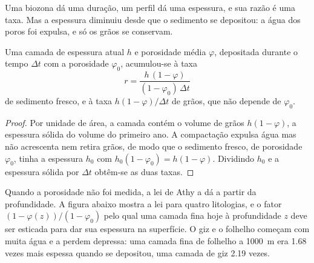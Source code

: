 Uma biozona dá uma duração, um perfil dá uma espessura, e sua razão é uma taxa. Mas a
espessura diminuiu desde que o sedimento se depositou: a água dos poros foi expulsa,
e só os grãos se conservam.

\begin{proposition}\label{prop:b2:palaeoenvironments:rate}
Uma camada de espessura atual $h$ e porosidade média $\varphi$, depositada durante o tempo $\Delta t$
com a porosidade $\varphi_0$, acumulou-se à taxa
\[
  r = \frac{h\,(1 - \varphi)}{(1 - \varphi_0)\,\Delta t}
\]
de sedimento fresco, e à taxa $h(1-\varphi)/\Delta t$ de grãos, que não depende de
$\varphi_0$.
\end{proposition}

\begin{proof}
Por unidade de área, a camada contém o volume de grãos $h(1 - \varphi)$, a espessura sólida do
volume do primeiro ano. A compactação expulsa água mas não acrescenta nem retira grãos, de modo que o sedimento
fresco, de porosidade $\varphi_0$, tinha a espessura $h_0$ com $h_0(1 - \varphi_0) = h(1 -
\varphi)$. Dividindo $h_0$ e a espessura sólida por $\Delta t$ obtêm-se as duas taxas.
\end{proof}

Quando a porosidade não foi medida, a lei de Athy a dá a partir da profundidade. A figura abaixo mostra
a lei para quatro litologias, e o fator $(1 - \varphi(z))/(1 - \varphi_0)$ pelo qual uma camada
fina hoje à profundidade $z$ deve ser esticada para dar sua espessura na superfície. O giz e o folhelho
começam com muita água e a perdem depressa: uma camada fina de folhelho a \qty{1000}{m} era 1.68 vezes
mais espessa quando se depositou, uma camada de giz 2.19 vezes.

